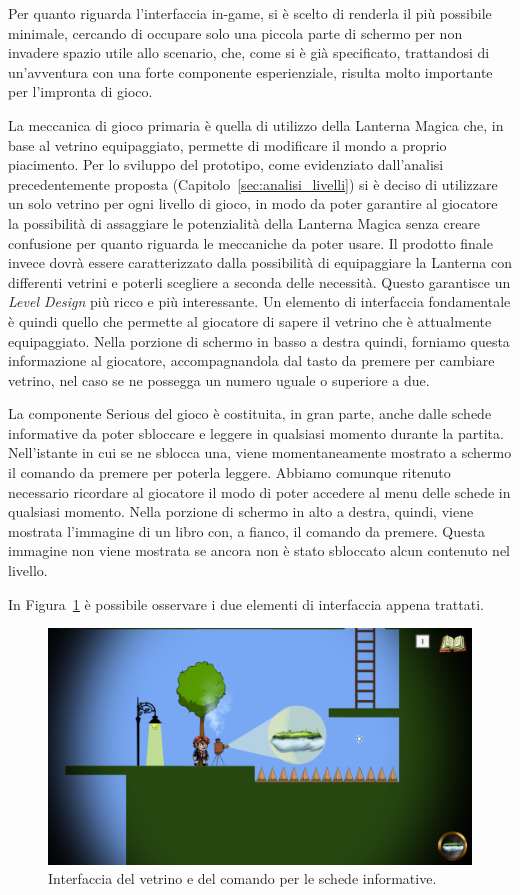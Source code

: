 Per quanto riguarda l’interfaccia in-game, si è scelto di renderla il più possibile minimale, cercando di occupare solo una piccola parte di schermo per non invadere spazio utile allo scenario, che, come si è già specificato, trattandosi di un’avventura con una forte componente esperienziale, risulta molto importante per l’impronta di gioco.

La meccanica di gioco primaria è quella di utilizzo della Lanterna Magica che, in base al vetrino equipaggiato, permette di modificare il mondo a proprio piacimento. Per lo sviluppo del prototipo, come evidenziato dall’analisi precedentemente proposta (Capitolo~\ref{sec:analisi_livelli}) si è deciso di utilizzare un solo vetrino per ogni livello di gioco, in modo da poter garantire al giocatore la possibilità di assaggiare le potenzialità della Lanterna Magica senza creare confusione per quanto riguarda le meccaniche da poter usare.
Il prodotto finale invece dovrà essere caratterizzato dalla possibilità di equipaggiare la Lanterna con differenti vetrini e poterli scegliere a seconda delle necessità. Questo garantisce un \textit{Level Design} più ricco e più interessante.
Un elemento di interfaccia fondamentale è quindi quello che permette al giocatore di sapere il vetrino che è attualmente equipaggiato.
Nella porzione di schermo in basso a destra quindi, forniamo questa informazione al giocatore, accompagnandola dal tasto da premere per cambiare vetrino, nel caso se ne possegga un numero uguale o superiore a due.

La componente Serious del gioco è costituita, in gran parte, anche dalle schede informative da poter sbloccare e leggere in qualsiasi momento durante la partita. Nell’istante in cui se ne sblocca una, viene momentaneamente mostrato a schermo il comando da premere per poterla leggere. Abbiamo comunque ritenuto necessario ricordare al giocatore il modo di poter accedere al menu delle schede in qualsiasi momento.  Nella porzione di schermo in alto a destra, quindi, viene mostrata l’immagine di un libro con, a fianco, il comando da premere. Questa immagine non viene mostrata se ancora non è stato sbloccato alcun contenuto nel livello.

In Figura~\ref{fig:interfaccia_ingame} è possibile osservare i due elementi di interfaccia appena trattati.

\begin{figure}%
	\centering
	\includegraphics[width= 0.9\columnwidth]{images/gameDesign/56_interfaccia.png}
	\caption{Interfaccia del vetrino e del comando per le schede informative.}
	\label{fig:interfaccia_ingame}
\end{figure}

